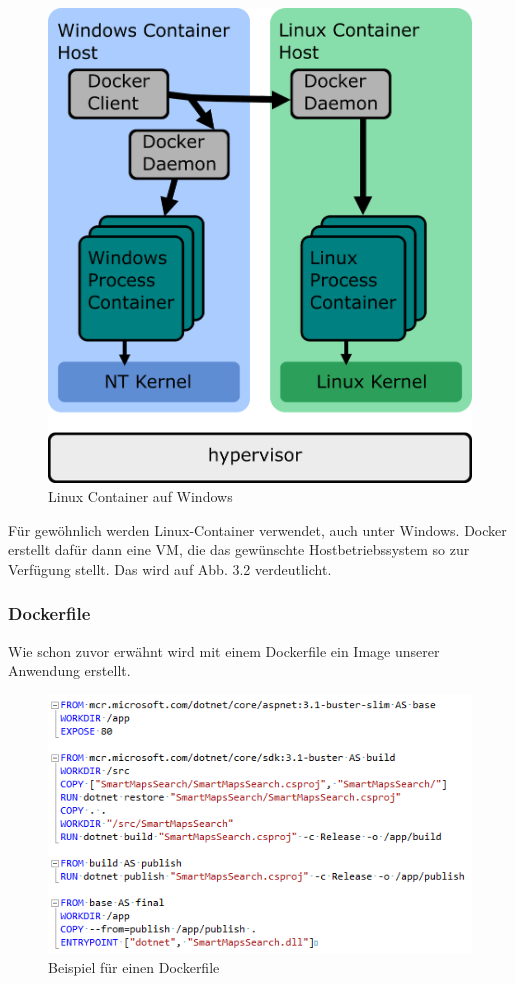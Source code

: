 \documentclass[12pt,a4paper]{scrartcl}
\begin{document}
\begin{figure}[h!]
	\centering
	\includegraphics[scale=2]{DockerWindows.png}
	\caption[https://docs.microsoft.com/de-de/virtualization/windowscontainers/deploy-containers/linux-containers]{Linux Container auf Windows}
\end{figure}

Für gewöhnlich werden Linux-Container verwendet, auch unter Windows. Docker erstellt dafür dann eine VM, die das gewünschte Hostbetriebssystem so zur Verfügung stellt. Das wird auf Abb. 3.2 verdeutlicht. 

\subsubsection{Dockerfile}

Wie schon zuvor erwähnt wird mit einem Dockerfile ein Image unserer Anwendung erstellt. 

\begin{figure}[h!]
	\centering
	\includegraphics[scale=1]{DockerfileWhite.png}
	\caption[Screenshot]{Beispiel für einen Dockerfile}
\end{figure}
\end{document}
